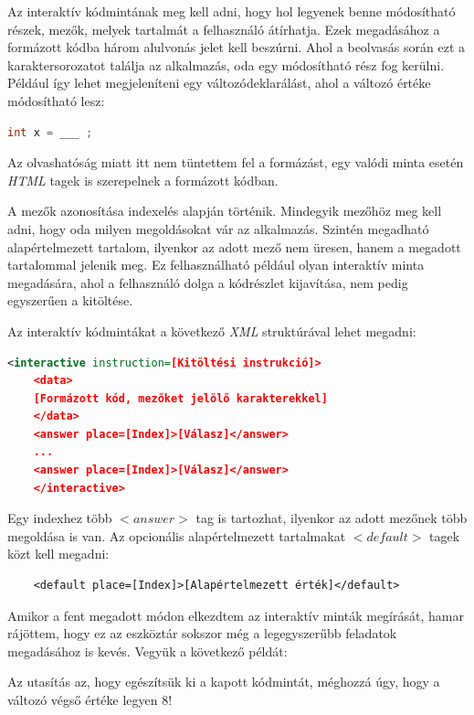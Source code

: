 \documentclass[12pt,a4paper]{article}
\newcommand{\xml}{\textit{XML}\xspace}
\begin{document}
	Az interaktív kódmintának meg kell adni, hogy hol legyenek benne módosítható részek, mezők, melyek tartalmát a felhasználó átírhatja. Ezek megadásához a formázott kódba három alulvonás jelet kell beszúrni. Ahol a beolvasás során ezt a karaktersorozatot találja az alkalmazás, oda egy módosítható rész fog kerülni. Például így lehet megjeleníteni egy változódeklarálást, ahol a változó értéke módosítható lesz:
	
	\bigskip
	\begin{lstlisting}[language=Java]
	int x = ___ ;
	\end{lstlisting}  
	\bigskip
	
	Az olvashatóság miatt itt nem tüntettem fel a formázást, egy valódi minta esetén \textit{HTML} tagek is szerepelnek a formázott kódban.
	
	A mezők azonosítása indexelés alapján történik. Mindegyik mezőhöz meg kell adni, hogy oda milyen megoldásokat vár az alkalmazás. Szintén megadható alapértelmezett tartalom, ilyenkor az adott mező nem üresen, hanem a megadott tartalommal jelenik meg. Ez felhasználható például olyan interaktív minta megadására, ahol a felhasználó dolga a kódrészlet kijavítása, nem pedig egyszerűen a kitöltése.
	
	Az interaktív kódmintákat a következő \xml struktúrával lehet megadni:
	
	\bigskip
	\begin{lstlisting}[language=XML]
	<interactive instruction=[Kitöltési instrukció]>
	<data>
	[Formázott kód, mezőket jelölő karakterekkel]
	</data>
	<answer place=[Index]>[Válasz]</answer>
	...
	<answer place=[Index]>[Válasz]</answer>
	</interactive>
	\end{lstlisting}
	\bigskip
	
	Egy indexhez több $<answer>$ tag is tartozhat, ilyenkor az adott mezőnek több megoldása is van. Az opcionális alapértelmezett tartalmakat $<default>$ tagek közt kell megadni:
	
	\bigskip %
	\begin{lstlisting}
	<default place=[Index]>[Alapértelmezett érték]</default>
	\end{lstlisting}
	\bigskip
	
	Amikor a fent megadott módon elkezdtem az interaktív minták megírását, hamar rájöttem, hogy ez az eszköztár sokszor még a legegyszerűbb feladatok megadásához is kevés. Vegyük a következő példát:
	
	Az utasítás az, hogy egészítsük ki a kapott kódmintát, méghozzá úgy, hogy a változó végső értéke legyen 8!
	
\end{document}
